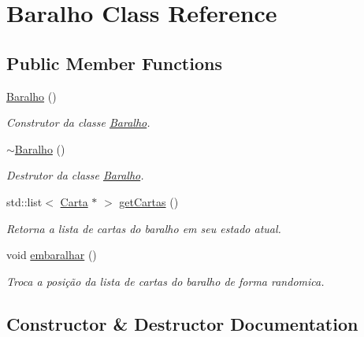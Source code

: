 \hypertarget{class_baralho}{}\section{Baralho Class Reference}
\label{class_baralho}
\subsection*{Public Member Functions}
\begin{DoxyCompactItemize}
\item 
\mbox{\hyperlink{class_baralho_a9a4fc696fcb495e1fe625f56b25e4ec4}{Baralho}} ()
\begin{DoxyCompactList}\small\item\em Construtor da classe \mbox{\hyperlink{class_baralho}{Baralho}}. \end{DoxyCompactList}\item 
\mbox{\hyperlink{class_baralho_ae6732f805c72b2983255fc813b2d0422}{$\sim$\+Baralho}} ()
\begin{DoxyCompactList}\small\item\em Destrutor da classe \mbox{\hyperlink{class_baralho}{Baralho}}. \end{DoxyCompactList}\item 
std\+::list$<$ \mbox{\hyperlink{class_carta}{Carta}} $\ast$ $>$ \mbox{\hyperlink{class_baralho_aa8c0c91bec112680c071abb586e8fd71}{get\+Cartas}} ()
\begin{DoxyCompactList}\small\item\em Retorna a lista de cartas do baralho em seu estado atual. \end{DoxyCompactList}\item 
void \mbox{\hyperlink{class_baralho_a702ae6b1313a49896f202ab6eec709a8}{embaralhar}} ()
\begin{DoxyCompactList}\small\item\em Troca a posição da lista de cartas do baralho de forma randomica. \end{DoxyCompactList}\end{DoxyCompactItemize}


\subsection{Constructor \& Destructor Documentation}
\mbox{\label{class_baralho_a9a4fc696fcb495e1fe625f56b25e4ec4}} 
